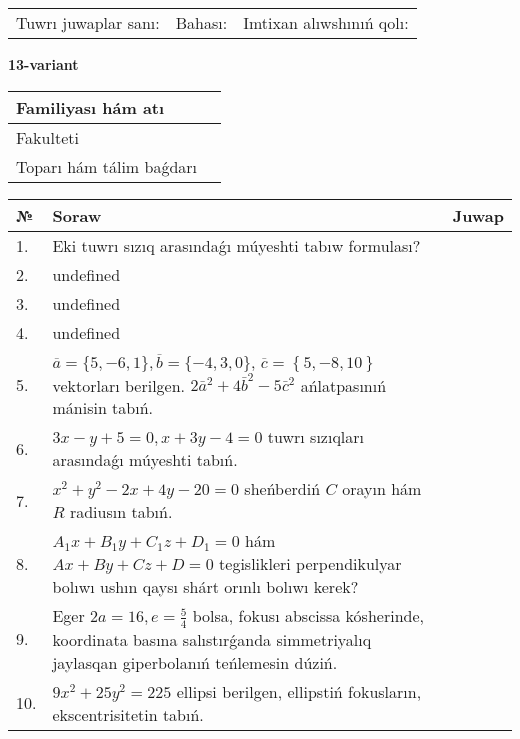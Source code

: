 \documentclass{article}
\begin{document}
\vspace{0.7cm}

\begin{tabular}{lll}
Tuwrı juwaplar sanı: \underline{\hspace{1cm}} & 
Bahası: \underline{\hspace{1cm}} & 
Imtixan alıwshınıń qolı: \underline{\hspace{2cm}} \\
\end{tabular}

\egroup

\newpage


\textbf{13-variant}\\

\bgroup
\def\arraystretch{1.6} %

\begin{tabular}{|m{5.7cm}|m{9.5cm}|}
\hline
Familiyası hám atı & \\
\hline
Fakulteti  & \\
\hline
Toparı hám tálim baǵdarı  & \\
\hline
\end{tabular}

\vspace{0.7cm}

\begin{tabular}{|m{0.7cm}|m{10cm}|m{4cm}|}
\hline
№ & Soraw & Juwap \\
\hline
1. & Eki tuwrı sızıq arasındaǵı múyeshti tabıw formulası? &  \\
\hline
2. & undefined &  \\
\hline
3. & undefined &  \\
\hline
4. & undefined &  \\
\hline
5. & \(\overline{a} = \{5,- 6, 1 \}, \overline{b} = \{ - 4, 3, 0 \} \), \(\overline{c} = \left\{ 5,- 8, 10 \right\}\) vektorları berilgen. \(2{\bar{a}}^{2} + 4{\bar{b}}^{2} - 5{\bar{c}}^{2}\) ańlatpasınıń mánisin tabıń. &  \\
\hline
6. & \(3 x - y + 5 = 0, x + 3 y - 4 = 0\) tuwrı sızıqları arasındaǵı múyeshti tabıń. &  \\
\hline
7. & \(x^{2} + y^{2} - 2 x + 4 y - 20 = 0\) sheńberdiń \(C\) orayın hám \(R\) radiusın tabıń. &  \\
\hline
8. & \(A_{1}x + B_{1}y + C_{1}z + D_{1} = 0\) hám \(Ax + By + Cz + D = 0\) tegislikleri perpendikulyar bolıwı ushın qaysı shárt orınlı bolıwı kerek? &  \\
\hline
9. & Eger \(2 a = 16, e = \frac{5}{4}\) bolsa, fokusı abscissa kósherinde, koordinata basına salıstırǵanda simmetriyalıq jaylasqan giperbolanıń teńlemesin dúziń. &  \\
\hline
10. & \(9 x^{2} + 25 y^{2} = 225\) ellipsi berilgen, ellipstiń fokusların, ekscentrisitetin tabıń. & \\
\hline
\end{tabular}
\end{document}
